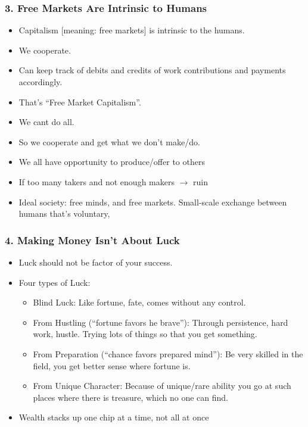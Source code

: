 \begin{frame}[fragile]
\frametitle{3. Free Markets Are Intrinsic to Humans}
\begin{itemize}
\item Capitalism [meaning: free markets] is intrinsic to the humans. 
\item We cooperate. 
\item Can keep track of debits and credits of work contributions and payments accordingly. 
\item That's ``Free Market Capitalism''.
\item We cant do all. 
\item So we cooperate and get what we don't make/do. 
\item We all have opportunity to produce/offer to others
\item If too many takers and not enough makers $\rightarrow$ ruin
\item Ideal society: free minds, and free markets. Small-scale exchange between humans that's voluntary,
\end{itemize}
\end{frame}

\begin{frame}[fragile]
\frametitle{4. Making Money Isn't About Luck}
\begin{itemize}
\item Luck should not be factor of your success.
\item Four types of Luck:
\begin{itemize}
\item Blind Luck: Like fortune, fate, comes without any control.
\item From Hustling (``fortune favors he brave''): Through persistence, hard work, hustle. Trying lots of things so that you get something.
\item From Preparation (``chance favors prepared mind''): Be very skilled in the field, you get better sense where fortune is.
\item From Unique Character: Because of unique/rare ability you go at such places where there is treasure, which no one can find.
\end{itemize}
\item Wealth stacks up one chip at a time, not all at once

\end{itemize}
\end{frame}

